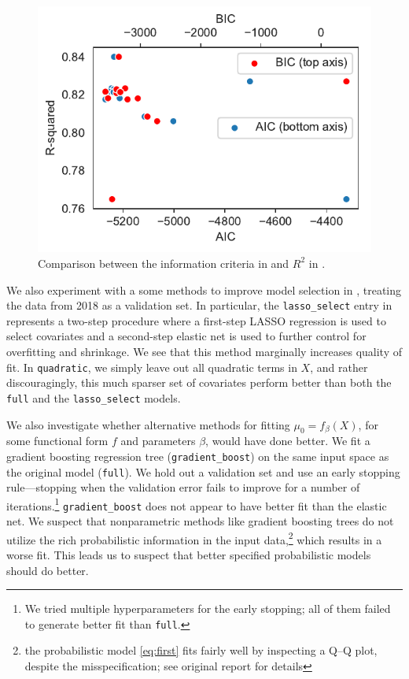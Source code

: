 \documentclass[12pt]{article}
\begin{document}
\begin{figure}[tb]
  \centering
  \includegraphics{ic_rsq.pdf}
  \caption{Comparison between the information criteria in  and $R^2$ in .}
  \label{fig:ic_r2}
\end{figure}

We also experiment with a some methods to improve model selection in , treating the data from 2018 as a validation set. In particular, the \texttt{lasso\_select} entry in  represents a two-step procedure where a first-step LASSO regression is used to select covariates and a second-step elastic net is used to further control for overfitting and shrinkage. We see that this method marginally increases quality of fit. In \texttt{quadratic}, we simply leave out all quadratic terms in $X$, and rather discouragingly, this much sparser set of covariates perform better than both the \texttt{full} and the \texttt{lasso\_select} models. 

We also investigate whether alternative methods for fitting $\mu_0 =
f_\beta(X)$, for some functional form $f$ and parameters $\beta$, would have
done better. We fit a gradient boosting regression tree
(\texttt{gradient\_boost}) on the same input space as the original model
(\texttt{full}). We hold out a validation set and use an early stopping
rule---stopping when the validation error fails to improve for a number of
iterations.\footnote{We tried multiple hyperparameters for the early stopping;
all of them failed to generate better fit than \texttt{full}.}
\texttt{gradient\_boost} does not appear to have better fit than the elastic
net. We suspect that nonparametric methods like gradient boosting trees do not
utilize the rich probabilistic information in the input data,\footnote{the probabilistic
model \eqref{eq:first} fits fairly well by inspecting a Q--Q plot, despite the misspecification; see original
report for details} which results in a worse fit. This leads us to suspect that
better specified probabilistic models should do better. 
\end{document}
